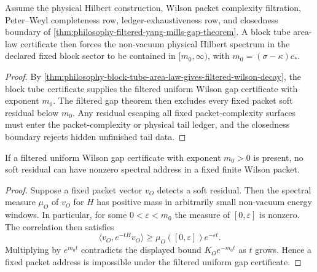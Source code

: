\begin{corollary}
\label{cor:philosophy-block-tube-area-law-gives-fixed-sector-gap}
Assume the physical Hilbert construction, Wilson packet complexity
filtration, Peter--Weyl completeness row, ledger-exhaustiveness row, and
closedness boundary of
\autoref{thm:philosophy-filtered-yang-mills-gap-theorem}. A block tube
area-law certificate then forces the non-vacuum physical Hilbert spectrum in
the declared fixed block sector to be contained in $[m_0,\infty)$, with
$m_0=(\sigma-\kappa)c_{\ast}$.
\end{corollary}
\begin{proof}
By
\autoref{thm:philosophy-block-tube-area-law-gives-filtered-wilson-decay}, the
block tube certificate supplies the filtered uniform Wilson gap certificate
with exponent $m_0$. The filtered gap theorem then excludes every fixed
packet soft residual below $m_0$. Any residual escaping all fixed
packet-complexity surfaces must enter the packet-complexity or physical tail
ledger, and the closedness boundary rejects hidden unfinished tail data.
\end{proof}

\begin{theorem}
\label{thm:philosophy-filtered-gap-excludes-fixed-packet-soft-residuals}
If a filtered uniform Wilson gap certificate with exponent $m_0>0$ is
present, no soft residual can have nonzero spectral address in a fixed
finite Wilson packet.
\end{theorem}
\begin{proof}
Suppose a fixed packet vector $v_O$ detects a soft residual. Then the
spectral measure $\mu_O$ of $v_O$ for $H$ has positive mass in arbitrarily
small non-vacuum energy windows. In particular, for some
$0<\varepsilon<m_0$ the measure of $[0,\varepsilon]$ is nonzero. The
correlation then satisfies
$$
\langle v_O,e^{-tH}v_O\rangle
\ge
\mu_O([0,\varepsilon])e^{-\varepsilon t}.
$$
Multiplying by $e^{m_0t}$ contradicts the displayed bound
$K_Oe^{-m_0t}$ as $t$ grows. Hence a fixed packet address is impossible
under the filtered uniform gap certificate.
\end{proof}

